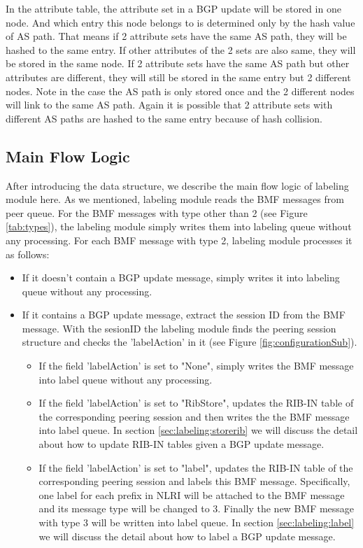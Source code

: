In the attribute table, the attribute set in a BGP update will be stored in one node. And which entry this node belongs to is determined only by the hash value of AS path.
That means if 2 attribute sets have the same AS path, they will be hashed to the same entry. If other attributes of the 2 sets are also same, they will be stored in the same node. 
If 2 attribute sets have the same AS path but other attributes are different, they will still be stored in the same entry but 2 different nodes.  
Note in the case the AS path is only stored once and the 2 different nodes will link to the same AS path.
Again it is possible that  2 attribute sets with different AS paths are hashed to the same entry because of hash collision.

   

\subsection{Main Flow Logic}
\label{sec:labeling:mainflow}
After introducing the data structure, we describe the main flow logic of labeling module here. As we mentioned, labeling module reads the BMF messages from peer queue. For the BMF messages with type other than 2 (see Figure \ref{tab:types}), the labeling module simply writes them into labeling queue without any processing.  For each BMF message with type 2, labeling module processes it as follows:  
\begin{itemize}
\item{If it doesn't contain a BGP update message, simply writes it into labeling queue without any processing.}
\item{If it contains a BGP update message,  extract the session ID from the BMF message. With the sesionID the labeling module finds the peering session structure and checks the 'labelAction' in it (see Figure \ref{fig:configurationSub}).  }
	\begin{itemize}
		\item{If the field 'labelAction' is set to "None", simply writes the BMF message into label queue without any processing.}
		\item{If the field 'labelAction' is set to "RibStore", updates the RIB-IN table of the corresponding peering session and then writes the the BMF message into label queue. In section \ref{sec:labeling:storerib} we will discuss the detail about how to update RIB-IN tables given a BGP update message. }
			\item{If the field 'labelAction' is set to "label", updates the RIB-IN table of the corresponding peering session and labels this BMF message. Specifically, one label for each prefix in NLRI will be attached to the BMF message and its message type will be changed to 3. Finally the new BMF message with type 3 will be written into label queue. In section \ref{sec:labeling:label} we will discuss the detail about how to label a BGP update message.}
	\end{itemize}
\end{itemize}

